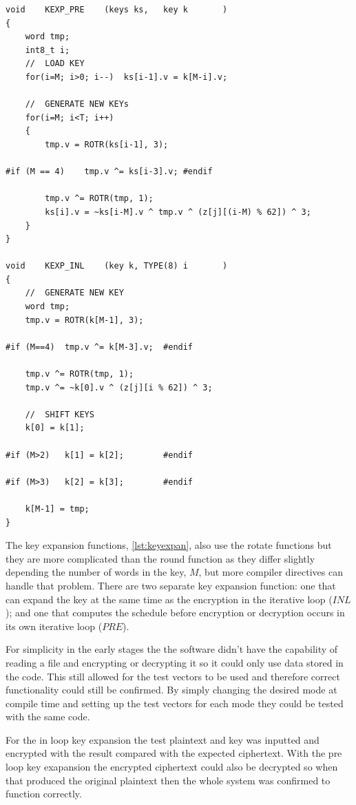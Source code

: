 \documentclass[12pt,twoside,a4paper]{report}
\begin{document}
	\begin{minipage}{\linewidth}
	\begin{lstlisting}[label={lst:keyexpan},caption={Key Expansion Functions},style=CStyle]
void	KEXP_PRE	(keys ks,	key k		)
{
	word tmp;
	int8_t i;
	//	LOAD KEY
	for(i=M; i>0; i--)	ks[i-1].v = k[M-i].v;
	
	//	GENERATE NEW KEYs
	for(i=M; i<T; i++)
	{
		tmp.v = ROTR(ks[i-1], 3);
		
#if (M == 4)	tmp.v ^= ks[i-3].v;	#endif

		tmp.v ^= ROTR(tmp, 1);
		ks[i].v = ~ks[i-M].v ^ tmp.v ^ (z[j][(i-M) % 62]) ^ 3;
	}
}

void	KEXP_INL	(key k,	TYPE(8) i		)
{
	//	GENERATE NEW KEY	
	word tmp;
	tmp.v = ROTR(k[M-1], 3);
	
#if (M==4)	tmp.v ^= k[M-3].v;	#endif

	tmp.v ^= ROTR(tmp, 1);
	tmp.v ^= ~k[0].v ^ (z[j][i % 62]) ^ 3;
	
	//	SHIFT KEYS
	k[0] = k[1];
	
#if (M>2)	k[1] = k[2];		#endif

#if (M>3)	k[2] = k[3];		#endif

	k[M-1] = tmp;
}
	\end{lstlisting}
	\end{minipage}
	
	The key expansion functions, \autoref{lst:keyexpan}, also use the rotate functions but they are more complicated than the round function as they differ slightly depending the number of words in the key, $M$, but more compiler directives can handle that problem. There are two separate key expansion function: one that can expand the key at the same time as the encryption in the iterative loop ($INL$); and one that computes the schedule before encryption or decryption occurs in its own iterative loop ($PRE$).
    
	For simplicity in the early stages the the software didn't have the capability of reading a file and encrypting or decrypting it so it could only use data stored in the code. This still allowed for the test vectors to be used and therefore correct functionality could still be confirmed.  By simply changing the desired mode at compile time and setting up the test vectors for each mode they could be tested with the same code.
	
	For the in loop key expansion the test plaintext and key was inputted and encrypted with the result compared with the expected ciphertext. With the pre loop key exapansion the encrypted ciphertext could also be decrypted so when that produced the original plaintext then the whole system was confirmed to function correctly.
    
\end{document}
